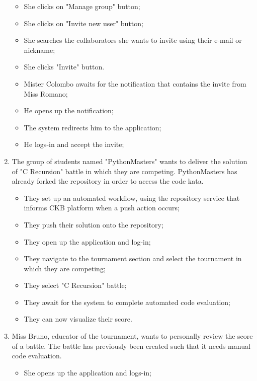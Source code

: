 \documentclass[../RASD.tex]{subfiles}
\begin{document}
\begin{enumerate}
{\begin{itemize}
                \item {She clicks on "Manage group" button;}
                \item {She clicks on "Invite new user" button;}
                \item {She searches the collaborators she wants to invite using their e-mail or nickname;}
                \item {She clicks "Invite" button.}
                \item {Mister Colombo awaits for the notification that contains the invite from Miss Romano;}
                \item {He opens up the notification;}
                \item {The system redirects him to the application;}
                \item {He logs-in and accept the invite;}
            \end{itemize}}
            \item {The group of students named "PythonMasters" wants to deliver the solution of "C Recursion" battle in which they are competing.
            PythonMasters has already forked the repository in order to access the code kata.
            \begin{itemize}
                \item {They set up an automated workflow, using the repository service that informs CKB platform when a push action occurs;}
                \item {They push their solution onto the repository;}
                \item {They open up the application and log-in;}
                \item {They navigate to the tournament section and select the tournament in which they are competing;}
                \item {They select "C Recursion" battle;}
                \item {They await for the system to complete automated code evaluation;}
                \item {They can now visualize their score.}
            \end{itemize}}
            \item {Miss Bruno, educator of the tournament, wants to personally review the score of a battle.
            The battle has previously been created such that it needs manual code evaluation.
            \begin{itemize}
                \item {She opens up the application and logs-in;}

\end{itemize}}
\end{enumerate}
\end{document}

